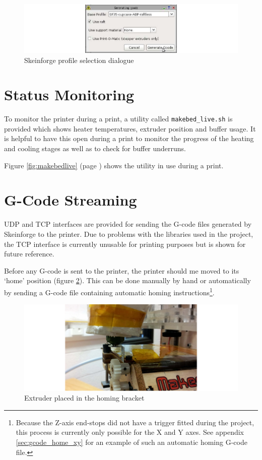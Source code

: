 		\begin{figure}
			\includegraphics[width=1\textwidth]{diagrams/skeinforge.pdf}
			\caption{Skeinforge profile selection dialogue}
			\label{fig:skeinforge}
		\end{figure}
	
	\section{Status Monitoring}
		
		To monitor the printer during a print, a utility called
		\verb|makebed_live.sh| is provided which shows heater temperatures, extruder
		position and buffer usage. It is helpful to have this open during a print to
		monitor the progress of the heating and cooling stages as well as to check
		for buffer underruns.
		
		Figure \ref{fig:makebedlive} (page \pageref{fig:makebedlive}) shows the
		utility in use during a print.
		
	\section{G-Code Streaming}
		
		UDP and TCP interfaces are provided for sending the G-code files generated
		by Skeinforge to the printer. Due to problems with the libraries used in the
		project, the TCP interface is currently unusable for printing purposes but
		is shown for future reference.
		
		Before any G-code is sent to the printer, the printer should me moved to its
		`home' position (figure \ref{fig:homing}). This can be done manually by hand
		or automatically by sending a G-code file containing automatic homing
		instructions\footnote{Because the Z-axis end-stops did not have a trigger
		fitted during the project, this process is currently only possible for the X
		and Y axes. See appendix \ref{sec:gcode_home_xy} for an example of such an
		automatic homing G-code file.}.
		
		\begin{figure}
			\includegraphics[width=1\textwidth]{diagrams/homing.pdf}
			\caption{Extruder placed in the homing bracket}
			\label{fig:homing}
		\end{figure}
			
